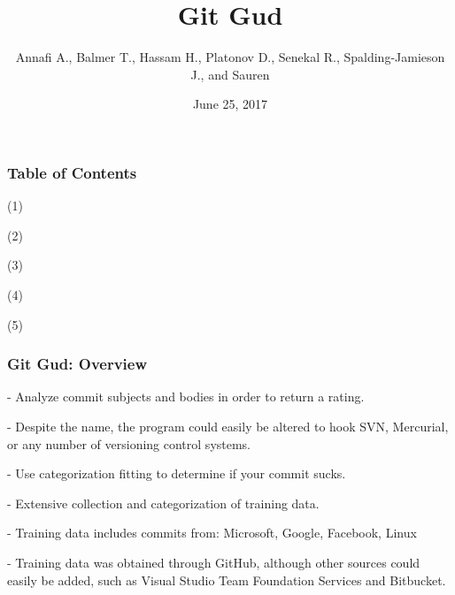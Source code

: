 \documentclass{beamer}
\title{\Large \bf Git Gud}
\author{Annafi A., Balmer T., Hassam H., Platonov D., Senekal R., Spalding-Jamieson J., and Sauren}
\institute{Students of UBC, UVic, and SFU} %
\date{June 25, 2017}
\begin{document}
\begin{frame}
	\titlepage
\end{frame}

\begin{frame}

\frametitle{Table of Contents}
	\begin{description}
		\item{(1)}
		\item{(2)}
		\item{(3)}
		\item{(4)}
		\item{(5)}
	\end{description}

\end{frame}

\begin{frame}

\frametitle{Git Gud: Overview}
	\begin{description}
		\item{-} Analyze commit subjects and bodies in order to return a rating.
		\item{-} Despite the name, the program could easily be altered to hook
			SVN, Mercurial, or any number of versioning control systems.
		\item{-} Use categorization fitting to determine if your commit sucks.
		\item{-} Extensive collection and categorization of training data.
		\item{-} Training data includes commits from: Microsoft, Google, Facebook, Linux
		\item{-} Training data was obtained through GitHub, although other sources could easily be added,
			such as Visual Studio Team Foundation Services and Bitbucket.
	\end{description}

\end{frame}
\end{document}
